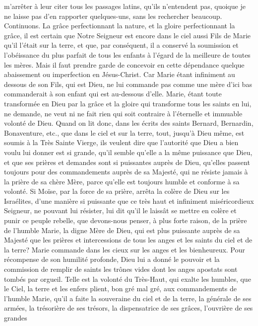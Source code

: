 m'arrêter à leur citer tous les passages latins, qu'ils n'entendent pas, quoique je ne laisse pas d'en rapporter
quelques-uns, sans les rechercher beaucoup. Continuons.
 La grâce perfectionnant la nature, et la gloire perfectionnant la grâce, il est certain que Notre Seigneur est
encore dans le ciel aussi Fils de Marie qu'il l'était sur la terre, et que, par conséquent, il a conservé la soumission
et l'obéissance du plus parfait de tous les enfants à l'égard de la meilleure de toutes les mères. Mais il faut prendre
garde de concevoir en cette dépendance quelque abaissement ou imperfection en Jésus-Christ. Car Marie étant
infiniment au dessous de son Fils, qui est Dieu, ne lui commande pas comme une mère d'ici bas commanderait à
son enfant qui est au-dessous d'elle. Marie, étant toute transformée en Dieu par la grâce et la gloire qui transforme
tous les saints en lui, ne demande, ne veut ni ne fait rien qui soit contraire à l'éternelle et immuable volonté de
Dieu. Quand on lit donc, dans les écrits des saints Bernard, Bernardin, Bonaventure, etc., que dans le ciel et sur la
terre, tout, jusqu'à Dieu même, est soumis à la Très Sainte Vierge, ils veulent dire que l'autorité que Dieu a bien
voulu lui donner est si grande, qu'il semble qu'elle a la même puissance que Dieu, et que ses prières et demandes
sont si puissantes auprès de Dieu, qu'elles passent toujours pour des commandements auprès de sa Majesté, qui
ne résiste jamais à la prière de sa chère Mère, parce qu'elle est toujours humble et conforme à sa volonté.
Si Moïse, par la force de sa prière, arrêta la colère de Dieu sur les Israélites, d'une manière si puissante que ce
très haut et infiniment miséricordieux Seigneur, ne pouvant lui résister, lui dit qu'il le laissât se mettre en colère et
punir ce peuple rebelle, que devons-nous penser, à plus forte raison, de la prière de l'humble Marie, la digne Mère
de Dieu, qui est plus puissante auprès de sa Majesté que les prières et intercessions de tous les anges et les
saints du ciel et de la terre?
 Marie commande dans les cieux sur les anges et les bienheureux. Pour récompense de son humilité profonde,
Dieu lui a donné le pouvoir et la commission de remplir de saints les trônes vides dont les anges apostats sont
tombés par orgueil. Telle est la volonté du Très-Haut, qui exalte les humbles, que le Ciel, la terre et les enfers
plient, bon gré mal gré, aux commandements de l'humble Marie, qu'il a faite la souveraine du ciel et de la terre, la
générale de ses armées, la trésorière de ses trésors, la dispensatrice de ses grâces, l'ouvrière de ses grandes
